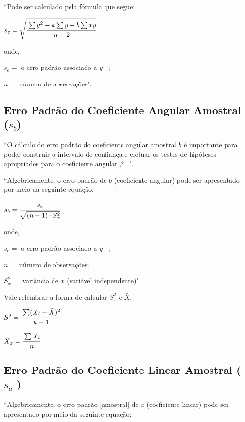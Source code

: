 		``Pode ser calculado pela fórmula que segue:
		
		\bigskip
		
		{\Large $ s_{e} = \sqrt{\cfrac{\sum y^{2} - a \sum y - b \sum xy}{n - 2}} $}
		
		\bigskip
		
		onde,
		
		$ s_{e} = $ o erro padrão associado a $ y $ \ ;
		
		$ n = $ número de observações". \cite{torres}

	\subsection{Erro Padrão do Coeficiente Angular Amostral ($ s_{b} $)}

		``O cálculo do erro padrão do coeficiente angular amostral $ b $ é importante para poder construir o intervalo de confiança e efetuar os testes de hipóteses apropriados para o coeficiente angular $ \beta $ \ ". \cite{torres}

		``Algebricamente, o erro padrão de $ b $ (coeficiente angular) pode ser apresentado por meio da seguinte equação:
		
		\bigskip
		
		{\Large $ s_{b} = \cfrac{s_{e}}{\sqrt{(n-1) \cdot S_{x}^{2}}} $}
		
		\bigskip
		
		onde,
		
		$ s_{e} = $ o erro padrão associado a $ y $ \ ;

		$ n = $ número de observações;
		
		$ S_{x}^{2} = $ variância de $ x $ (variável independente)". \cite{torres}

		\bigskip

		Vale relembrar a forma de calcular $ S_{x}^{2} $ e $ \bar X $.
		
		\bigskip
		
		{\Large $ S^{2} = \cfrac{\sum (X_{i} - \bar X)^{2}}{n-1} $}
		
		\bigskip
		
		{\Large $ \bar X_{x} = \cfrac{\sum X_{i}}{n} $}

	\subsection{Erro Padrão do Coeficiente Linear Amostral ( $ s_{a} $ )}

		``Algebricamente, o erro padrão [amostral] de $ a $ (coeficiente linear) pode ser apresentado por meio da seguinte equação:
		
